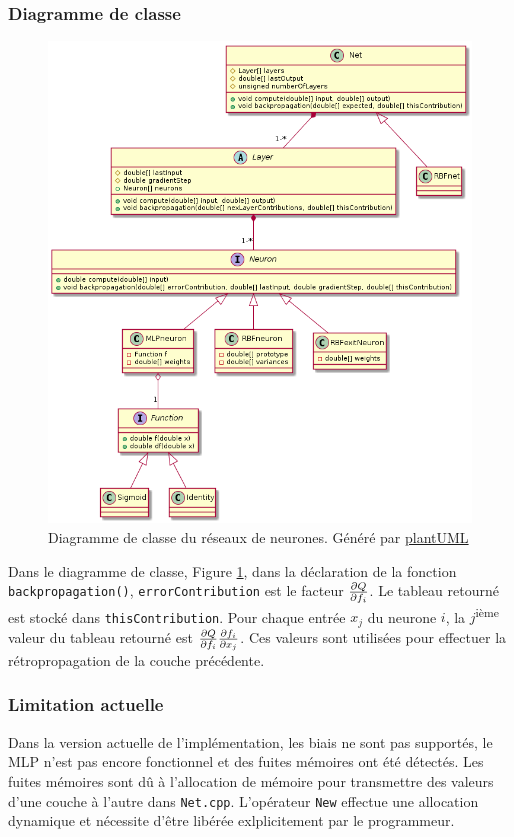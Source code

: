 \documentclass[12pt,a4paper,oneside, titlepage]{article}
\begin{document}
\subsubsection{Diagramme de classe}
\begin{figure}
 \centering
 \includegraphics[width=\textwidth]{../../uml/neurondiag.png}
 \caption{Diagramme de classe du réseaux de neurones. \footnotesize Généré par \href{http://plantuml.com/class-diagram}{plantUML}}
 \label{fig:diagclasse}
\end{figure}
Dans le diagramme de classe, Figure \ref{fig:diagclasse}, dans la déclaration de la fonction \texttt{backpropagation()}, \texttt{errorContribution} est le facteur $\frac{\partial Q}{\partial f_i}$.
Le tableau retourné est stocké dans \texttt{thisContribution}.
Pour chaque entrée $x_j$ du neurone $i$, la $j$\textsuperscript{ième} valeur du tableau retourné est $\frac{\partial Q}{\partial f_i}\frac{\partial f_i}{\partial x_j}$.
Ces valeurs sont utilisées pour effectuer la rétropropagation de la couche précédente.

\subsubsection{Limitation actuelle}
Dans la version actuelle de l'implémentation, les biais ne sont pas supportés, le MLP n'est pas encore fonctionnel et des fuites mémoires ont été détectés.
Les fuites mémoires sont dû à l'allocation de mémoire pour transmettre des valeurs d'une couche à l'autre dans \texttt{Net.cpp}.
L'opérateur \texttt{New} effectue une allocation dynamique et nécessite d'être libérée exlplicitement par le programmeur.
\end{document}
